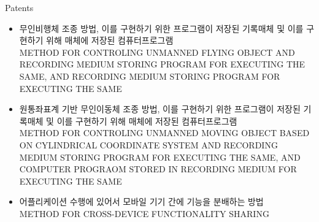 \begin{rSection}{Patents}
  \begin{itemize}
  \item 무인비행체 조종 방법, 이를 구현하기 위한 프로그램이 저장된 기록매체 및 이를 구현하기 위해 매체에 저장된 컴퓨터프로그램\\
METHOD FOR CONTROLING UNMANNED FLYING OBJECT AND RECORDING MEDIUM STORING PROGRAM FOR EXECUTING THE SAME, AND RECORDING MEDIUM STORING PROGRAM FOR EXECUTING THE SAME
  \item 원통좌표계 기반 무인이동체 조종 방법, 이를 구현하기 위한 프로그램이 저장된 기록매체 및 이를 구현하기 위해 매체에 저장된 컴퓨터프로그램\\
    METHOD FOR CONTROLING UNMANNED MOVING OBJECT BASED ON CYLINDRICAL COORDINATE SYSTEM AND RECORDING MEDIUM STORING PROGRAM FOR EXECUTING THE SAME, AND COMPUTER PROGRAOM STORED IN RECORDING MEDIUM FOR EXECUTING THE SAME
  \item 어플리케이션 수행에 있어서 모바일 기기 간에 기능을 분배하는 방법\\
METHOD FOR CROSS-DEVICE FUNCTIONALITY SHARING
  \end{itemize}
\end{rSection}